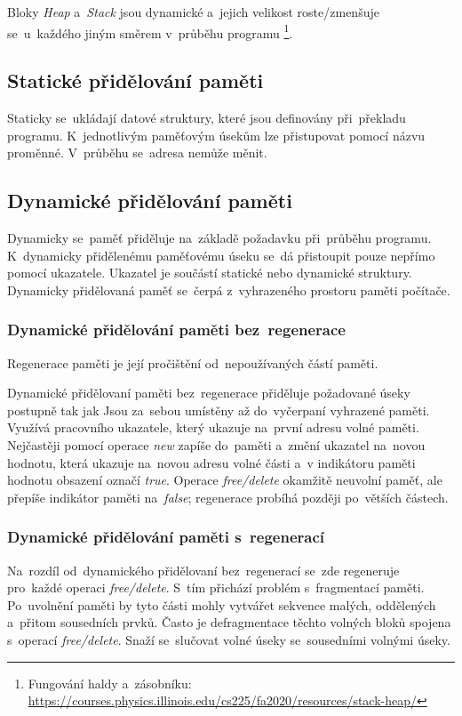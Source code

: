 Bloky \emph{Heap} a~\emph{Stack} jsou dynamické a~jejich velikost roste/zmenšuje se~u~každého jiným směrem v~průběhu programu%
\footnote{Fungování haldy a~zásobníku: \url{https://courses.physics.illinois.edu/cs225/fa2020/resources/stack-heap/}}.

\subsection{Statické přidělování paměti}

Staticky se~ukládají datové struktury, které jsou definovány při~překladu programu. K~jednotlivým paměťovým úsekům lze přistupovat pomocí názvu proměnné. V~průběhu se~adresa nemůže měnit.

\subsection{Dynamické přidělování paměti}

Dynamicky se~paměť přiděluje na~základě požadavku při~průběhu programu. K~dynamicky přidělenému paměťovému úseku se~dá přistoupit pouze nepřímo pomocí ukazatele. Ukazatel je součástí statické nebo dynamické struktury. Dynamicky přidělovaná paměť se~čerpá z~vyhrazeného prostoru paměti počítače.

\subsubsection{Dynamické přidělování paměti bez~regenerace}

Regenerace paměti je její pročištění od~nepoužívaných částí paměti.

Dynamické přidělovaní paměti bez~regenerace přiděluje požadované úseky postupně tak jak Jsou za~sebou umístěny až do~vyčerpaní vyhrazené paměti. Využívá pracovního ukazatele, který ukazuje na~první adresu volné paměti. Nejčastěji pomocí operace \emph{new} zapíše do~paměti a~změní ukazatel na~novou hodnotu, která ukazuje na~novou adresu volné části a~v indikátoru paměti hodnotu obsazení označí \emph{true}. Operace \emph{free/delete} okamžitě neuvolní paměť, ale přepíše indikátor paměti na~\emph{false}; regenerace probíhá později po~větších částech.

\subsubsection{Dynamické přidělování paměti s~regenerací}

Na~rozdíl od~dynamického přidělovaní bez~regenerací se~zde regeneruje pro~každé operaci \emph{free/delete}. S~tím přichází problém s~fragmentací paměti. Po~uvolnění paměti by tyto části mohly vytvářet sekvence malých, oddělených a~přitom sousedních prvků. Často je defragmentace těchto volných bloků spojena s~operací \emph{free/delete}. Snaží se~slučovat volné úseky se~sousedními volnými úseky.

